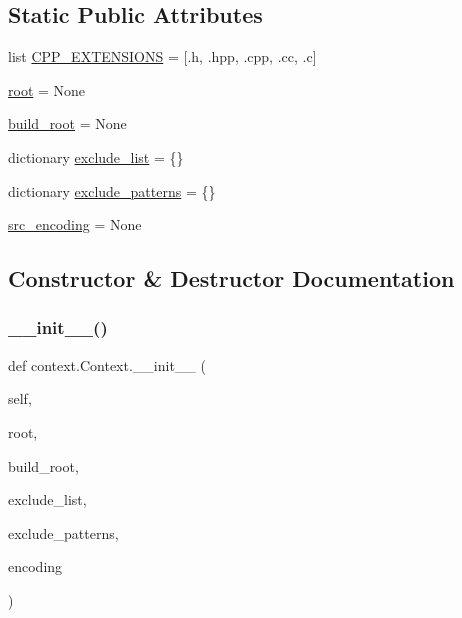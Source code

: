 \subsection*{Static Public Attributes}
\begin{DoxyCompactItemize}
\item 
list \mbox{\hyperlink{classcontext_1_1Context_a240677a569767099ae350293758ec528}{C\+P\+P\+\_\+\+E\+X\+T\+E\+N\+S\+I\+O\+NS}} = \mbox{[}\textquotesingle{}.h\textquotesingle{}, \textquotesingle{}.hpp\textquotesingle{}, \textquotesingle{}.cpp\textquotesingle{}, \textquotesingle{}.cc\textquotesingle{}, \textquotesingle{}.c\textquotesingle{}\mbox{]}
\item 
\mbox{\hyperlink{classcontext_1_1Context_aab200346bb18e64591c19f34391aacb9}{root}} = None
\item 
\mbox{\hyperlink{classcontext_1_1Context_a2887eacce1816189225825e86b36acf6}{build\+\_\+root}} = None
\item 
dictionary \mbox{\hyperlink{classcontext_1_1Context_afae62ed81a382a6452043d72bdef7fb9}{exclude\+\_\+list}} = \{\}
\item 
dictionary \mbox{\hyperlink{classcontext_1_1Context_aadc03f67f2b39d9287bce938e4ba773b}{exclude\+\_\+patterns}} = \{\}
\item 
\mbox{\hyperlink{classcontext_1_1Context_a3d1b84dad136691555472097d363843f}{src\+\_\+encoding}} = None
\end{DoxyCompactItemize}


\subsection{Constructor \& Destructor Documentation}
\mbox{\label{classcontext_1_1Context_a14509da5ce3ace35fd113fabf28ee7ec}} 
\subsubsection{\texorpdfstring{\_\_init\_\_()}{\_\_init\_\_()}}
{\footnotesize\ttfamily def context.\+Context.\+\_\+\+\_\+init\+\_\+\+\_\+ (\begin{DoxyParamCaption}\item[{}]{self,  }\item[{}]{root,  }\item[{}]{build\+\_\+root,  }\item[{}]{exclude\+\_\+list,  }\item[{}]{exclude\+\_\+patterns,  }\item[{}]{encoding }\end{DoxyParamCaption})}



